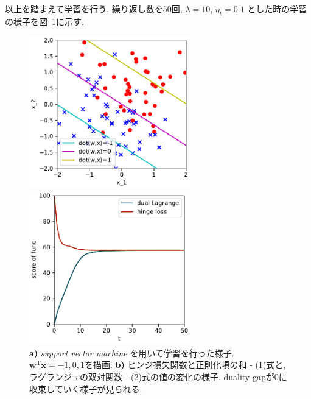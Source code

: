 \documentclass[a4paper,10pt]{jsarticle}
\begin{document}
以上を踏まえて学習を行う.
繰り返し数を$50$回, $\lambda=10$, $\eta_t = 0.1$ とした時の学習の様子を図~\ref{img:svm}に示す.
\begin{figure}[htbp]
 \begin{minipage}{0.5\hsize}
  \begin{center}
   \includegraphics[width=7cm]{figs/p3_svm_result.pdf}
  \end{center}
  \vspace{-0.5cm}
  \subcaption{}
 \end{minipage}
 \begin{minipage}{0.5\hsize}
  \begin{center}
   \includegraphics[width=7cm]{figs/p3_svm_gap.pdf}
  \end{center}
  \vspace{-0.5cm}
  \subcaption{}
 \end{minipage}
 \caption{\textbf{a)} \textit{support vector machine} を用いて学習を行った様子.
 $\bm{w}^\mathrm{T}\bm{x}=-1,0,1$を描画.
 \textbf{b)} ヒンジ損失関数と正則化項の和 - (1)式と,
 ラグランジュの双対関数 - (2)式の値の変化の様子.
 duality gapが0に収束していく様子が見られる.}
 \label{img:svm}
\end{figure}
\end{document}
